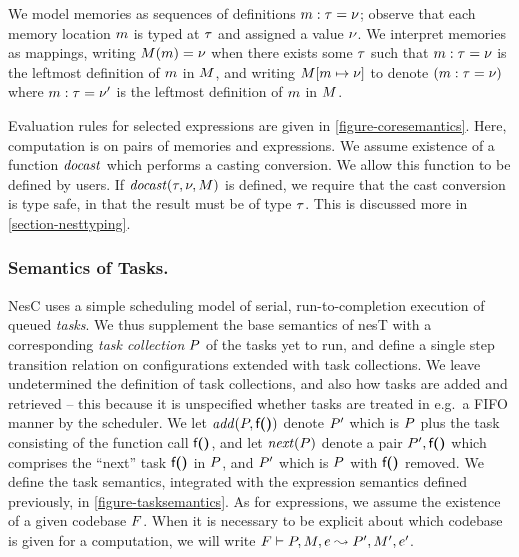 We model memories as sequences of definitions $m : \tau = {\nu}$; observe that each memory
location $m$ is typed at $\tau$ and assigned a value ${\nu}$. We interpret memories as mappings,
writing $M(m) = {\nu}$ when there exists some $\tau$ such that $m : \tau = {\nu}$ is the
leftmost definition of $m$ in $M$, and writing $M[m \mapsto {\nu}]$ to denote
$(m : \tau = {\nu})$ where $m : \tau = {\nu}'$ is the leftmost definition of $m$ in
$M$.%

Evaluation rules for selected expressions are given in \autoref{figure-coresemantics}. Here,
computation is on pairs of memories and expressions.
We assume existence of a function $\mathit{docast}$ which performs a casting conversion. We
allow this function to be defined by users.
If $\mathit{docast}(\tau,{\nu},M)$ is defined, we require that the cast
conversion is type safe, in that the result must be of type $\tau$.
This is discussed more in \autoref{section-nesttyping}. 


\subsubsection{Semantics of Tasks.} NesC uses a simple scheduling model of serial,
run-to-completion execution of queued \emph{tasks}. We thus supplement the base semantics of
nesT with a corresponding \emph{task collection} $P$ of the tasks yet to run, and define a
single step transition relation on configurations extended with task collections. We leave
undetermined the definition of task collections, and also how tasks are added and retrieved --
this because it is unspecified whether tasks are treated in e.g.~a FIFO manner by the scheduler.
We let $\mathit{add}(P,\textsf{f}\textbf{(}\textbf{)})$ denote $P'$ which is $P$ plus the task consisting
of the function call $\textsf{f}\textbf{(}\textbf{)}$, and let $\mathit{next}(P)$ denote a pair
$P',\textsf{f}\textbf{(}\textbf{)}$ which comprises the ``next'' task $\textsf{f}\textbf{(}\textbf{)}$ in $P$, and
$P'$ which is $P$ with $\textsf{f}\textbf{(}\textbf{)}$ removed. We define the task semantics,
integrated with the expression semantics defined previously, in \autoref{figure-tasksemantics}.
As for expressions, we assume the existence of a given codebase $F$. When it is necessary
to be explicit about which codebase is given for a computation, we will write $F \vdash
P, M, e \leadsto P', M', e'$.

